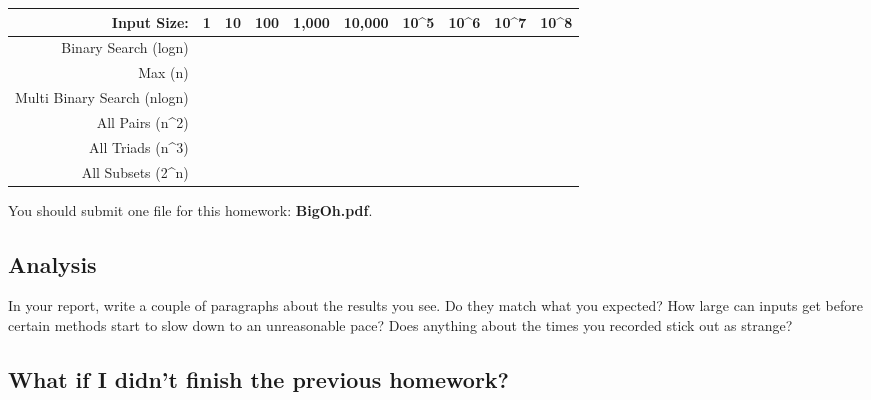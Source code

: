 \documentclass[paper=a4, fontsize=11pt, parskip=full]{scrartcl} %
\numberwithin{equation}{section} %
\numberwithin{figure}{section} %
\numberwithin{table}{section} %
\begin{document}
\renewcommand{\arraystretch}{2.0}
\begin{tabular}{|r|l|l|l|l|l|l|l|l|l|}
\hline
Input Size:                        & 1 & 10 & 100 & 1,000 & 10,000 & 10\textasciicircum{}5 & 10\textasciicircum{}6 & 10\textasciicircum{}7 & 10\textasciicircum{}8 \\ \hline
Binary Search (logn)               &   &    &     &       &        &                       &                       &                       &                       \\ \hline
Max (n)                            &   &    &     &       &        &                       &                       &                       &                       \\ \hline
Multi Binary Search (nlogn)        &   &    &     &       &        &                       &                       &                       &                       \\ \hline
All Pairs (n\textasciicircum{}2)   &   &    &     &       &        &                       &                       &                       &                       \\ \hline
All Triads (n\textasciicircum{}3)  &   &    &     &       &        &                       &                       &                       &                       \\ \hline
All Subsets (2\textasciicircum{}n) &   &    &     &       &        &                       &                       &                       &                       \\ \hline
\end{tabular}


You should submit one file for this homework: \textbf{BigOh.pdf}.

\subsection{Analysis}

In your report, write a couple of paragraphs about the results you see. Do they match what you expected? How large can inputs get before certain methods start to slow down to an unreasonable pace? Does anything about the times you recorded stick out as strange? 


\subsection{What if I didn't finish the previous homework?}
\end{document}
